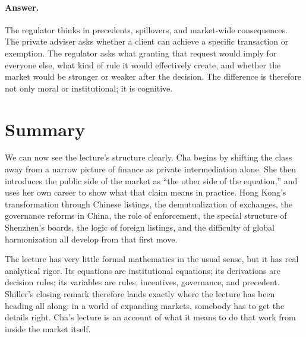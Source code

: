 \paragraph{Answer.} The regulator thinks in precedents, spillovers, and market-wide consequences. The private adviser asks whether a client can achieve a specific transaction or exemption. The regulator asks what granting that request would imply for everyone else, what kind of rule it would effectively create, and whether the market would be stronger or weaker after the decision. The difference is therefore not only moral or institutional; it is cognitive.

\section{Summary}

We can now see the lecture's structure clearly. Cha begins by shifting the class away from a narrow picture of finance as private intermediation alone. She then introduces the public side of the market as ``the other side of the equation,'' and uses her own career to show what that claim means in practice. Hong Kong's transformation through Chinese listings, the demutualization of exchanges, the governance reforms in China, the role of enforcement, the special structure of Shenzhen's boards, the logic of foreign listings, and the difficulty of global harmonization all develop from that first move.

The lecture has very little formal mathematics in the usual sense, but it has real analytical rigor. Its equations are institutional equations; its derivations are decision rules; its variables are rules, incentives, governance, and precedent. Shiller's closing remark therefore lands exactly where the lecture has been heading all along: in a world of expanding markets, somebody has to get the details right. Cha's lecture is an account of what it means to do that work from inside the market itself.